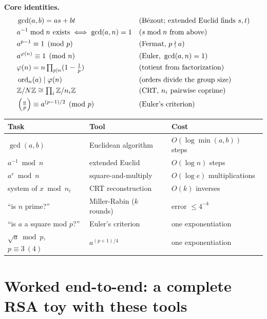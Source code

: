 \begin{focusbox}
\textbf{Core identities.}
\[
\begin{aligned}
&\gcd(a,b) = as+bt && \text{(B\'ezout; extended Euclid finds }s,t)\\
&a^{-1}\bmod n \text{ exists} \iff \gcd(a,n)=1 && (s\bmod n \text{ from above})\\
&a^{p-1}\equiv 1 \pmod p && \text{(Fermat, }p\nmid a)\\
&a^{\varphi(n)}\equiv 1 \pmod n && \text{(Euler, }\gcd(a,n)=1)\\
&\varphi(n) = n\textstyle\prod_{p\mid n}(1-\tfrac1p) && \text{(totient from factorization)}\\
&\operatorname{ord}_n(a) \mid \varphi(n) && \text{(orders divide the group size)}\\
&\mathbb{Z}/N\mathbb{Z}\cong \textstyle\prod_i \mathbb{Z}/n_i\mathbb{Z} && \text{(CRT, }n_i\text{ pairwise coprime)}\\
&\left(\tfrac{a}{p}\right)\equiv a^{(p-1)/2}\pmod p && \text{(Euler's criterion)}
\end{aligned}
\]
\end{focusbox}

\begin{center}
\renewcommand{\arraystretch}{1.25}
\begin{tabular}{@{}lll@{}}
\toprule
\textbf{Task} & \textbf{Tool} & \textbf{Cost}\\
\midrule
$\gcd(a,b)$                  & Euclidean algorithm          & $O(\log\min(a,b))$ steps\\
$a^{-1}\bmod n$              & extended Euclid              & $O(\log n)$ steps\\
$a^e \bmod n$               & square-and-multiply          & $O(\log e)$ multiplications\\
system of $x\bmod n_i$       & CRT reconstruction           & $O(k)$ inverses\\
``is $n$ prime?''            & Miller-Rabin ($k$ rounds)    & error $\le 4^{-k}$\\
``is $a$ a square mod $p$?'' & Euler's criterion            & one exponentiation\\
$\sqrt{a}\bmod p$, $p\equiv 3\ (4)$ & $a^{(p+1)/4}$         & one exponentiation\\
\bottomrule
\end{tabular}
\end{center}

\section{Worked end-to-end: a complete RSA toy with these tools}
\label{ch40:rsa-toy}

